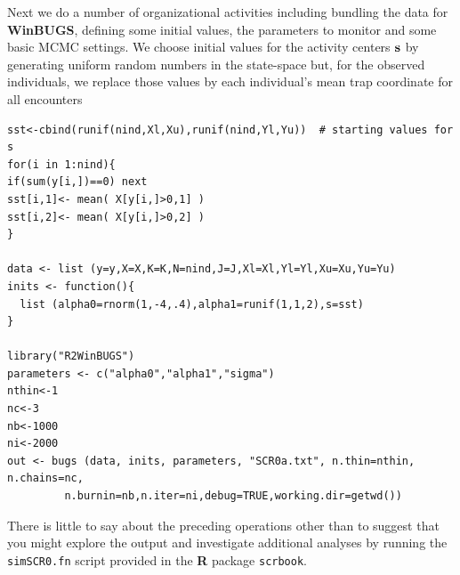 Next we do a number of organizational activities including bundling
the data for {\bf WinBUGS}, defining some initial values, the parameters to
monitor and some basic MCMC settings.  We choose initial values for
the activity centers ${\bf s}$ by generating uniform random numbers in
the state-space but, for the observed individuals, we replace those
values by each individual's mean trap coordinate for all encounters
{\small
\begin{verbatim}
sst<-cbind(runif(nind,Xl,Xu),runif(nind,Yl,Yu))  # starting values for s
for(i in 1:nind){
if(sum(y[i,])==0) next
sst[i,1]<- mean( X[y[i,]>0,1] )
sst[i,2]<- mean( X[y[i,]>0,2] )
}

data <- list (y=y,X=X,K=K,N=nind,J=J,Xl=Xl,Yl=Yl,Xu=Xu,Yu=Yu)
inits <- function(){
  list (alpha0=rnorm(1,-4,.4),alpha1=runif(1,1,2),s=sst)
}

library("R2WinBUGS")
parameters <- c("alpha0","alpha1","sigma")
nthin<-1
nc<-3
nb<-1000
ni<-2000
out <- bugs (data, inits, parameters, "SCR0a.txt", n.thin=nthin, n.chains=nc, 
         n.burnin=nb,n.iter=ni,debug=TRUE,working.dir=getwd())
\end{verbatim}
}
There is little to say about the preceding operations other than
to suggest that you might explore the output and investigate 
additional analyses by running the \mbox{\tt simSCR0.fn} script provided in the {\bf R}
package \mbox{\tt scrbook}. 

